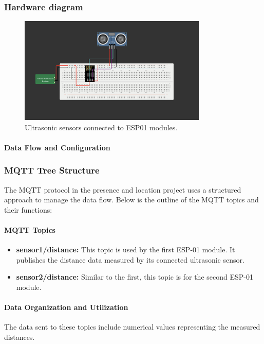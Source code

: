 \subsubsection{Hardware diagram}
\begin{figure}[ht]
    \centering
    \includegraphics[width=0.8\textwidth]{../images/presence-sensor.png}
    \caption{Ultrasonic sensors connected to ESP01 modules.}
    \label{fig:esp32_system_monitor}
\end{figure}

\paragraph{Data Flow and Configuration}

\subsubsection{MQTT Tree Structure}
The MQTT protocol in the presence and location project uses a structured approach to manage the data flow. Below is the outline of the MQTT topics and their functions:

\paragraph{MQTT Topics}
\begin{itemize}
    \item \textbf{sensor1/distance:} This topic is used by the first ESP-01 module. It publishes the distance data measured by its connected ultrasonic sensor.
    \item \textbf{sensor2/distance:} Similar to the first, this topic is for the second ESP-01 module.
\end{itemize}

\paragraph{Data Organization and Utilization}
The data sent to these topics include numerical values representing the measured distances. 
